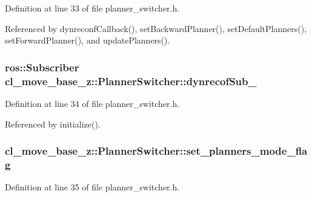 Definition at line 33 of file planner\+\_\+switcher.\+h.



Referenced by dynreconf\+Callback(), set\+Backward\+Planner(), set\+Default\+Planners(), set\+Forward\+Planner(), and update\+Planners().

\subsubsection[{\texorpdfstring{dynrecof\+Sub\+\_\+}{dynrecofSub_}}]{\setlength{\rightskip}{0pt plus 5cm}ros\+::\+Subscriber cl\+\_\+move\+\_\+base\+\_\+z\+::\+Planner\+Switcher\+::dynrecof\+Sub\+\_\+\hspace{0.3cm}{\ttfamily [private]}}\hypertarget{classcl__move__base__z_1_1PlannerSwitcher_ae902346f4f8e58241acc56cccaad8546}{}\label{classcl__move__base__z_1_1PlannerSwitcher_ae902346f4f8e58241acc56cccaad8546}


Definition at line 34 of file planner\+\_\+switcher.\+h.



Referenced by initialize().

\subsubsection[{\texorpdfstring{set\+\_\+planners\+\_\+mode\+\_\+flag}{set_planners_mode_flag}}]{ cl\+\_\+move\+\_\+base\+\_\+z\+::\+Planner\+Switcher\+::set\+\_\+planners\+\_\+mode\+\_\+flag\hspace{0.3cm}{\ttfamily [private]}}\hypertarget{classcl__move__base__z_1_1PlannerSwitcher_a6c14fd001513787ed213704e2d3dc383}{}\label{classcl__move__base__z_1_1PlannerSwitcher_a6c14fd001513787ed213704e2d3dc383}


Definition at line 35 of file planner\+\_\+switcher.\+h.



